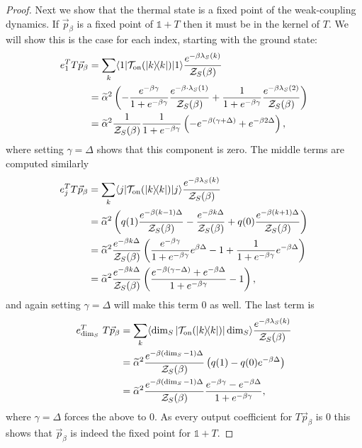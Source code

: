 \documentclass{article}
\newcommand{\on}{\rm on}
\newcommand{\ket}[1]{|#1\rangle}
\newcommand{\bra}[1]{\langle #1|}
\newcommand{\ketbra}[2]{| #1\rangle\! \langle #2|}
\newcommand{\partfun}{\mathcal{Z}}
\newcommand{\identity}{\mathds{1}}
\begin{document}
\begin{proof}
Next we show that the thermal state is a fixed point of the weak-coupling dynamics. If $\vec{p}_{\beta}$ is a fixed point of $\identity + T$ then it must be in the kernel of $T$. We will show this is the case for each index, starting with the ground state:
\begin{align}
    e_1^T T \vec{p}_{\beta} &= \sum_{k} \bra{1} \mathcal{T}_{\on}(\ketbra{k}{k}) \ket{1} \frac{e^{-\beta \lambda_S(k)}}{\partfun_S(\beta)} \\
    &= \widetilde{\alpha}^2 \left( -\frac{e^{-\beta \gamma}}{1 + e^{-\beta \gamma}} \frac{e^{-\beta \cdot \lambda_S(1)}}{\partfun_S(\beta)} + \frac{1}{1 + e^{-\beta \gamma}} \frac{e^{-\beta \lambda_S(2)}}{\partfun_S(\beta)} \right) \\
    &= \widetilde{\alpha}^2 \frac{1}{\partfun_S(\beta)} \frac{1}{1 + e^{-\beta \gamma}} \left( - e^{-\beta (\gamma + \Delta)} + e^{-\beta 2 \Delta} \right),
\end{align}
where setting $\gamma = \Delta$ shows that this component is zero.
The middle terms are computed similarly
\begin{align}
    e_j^T T \vec{p}_{\beta} &= \sum_{k} \bra{j} \mathcal{T}_{\on}(\ketbra{k}{k}) \ket{j} \frac{e^{-\beta \lambda_S(k)}}{\partfun_S(\beta)} \\
    &=\widetilde{\alpha}^2 \left( q(1) \frac{e^{-\beta (k - 1)\Delta }}{\partfun_S(\beta)} - \frac{e^{-\beta k \Delta}}{\partfun_S(\beta)} + q(0) \frac{e^{-\beta (k + 1) \Delta}}{\partfun_S(\beta)} \right) \\
    &= \widetilde{\alpha}^2 \frac{e^{-\beta k \Delta}}{\partfun_S(\beta)} \left( \frac{e^{-\beta \gamma}}{1 + e^{-\beta \gamma}} e^{\beta \Delta} - 1 + \frac{1}{1 + e^{-\beta \gamma}} e^{-\beta \Delta} \right) \\
    &= \widetilde{\alpha}^2 \frac{e^{-\beta k \Delta}}{\partfun_S(\beta)} \left( \frac{e^{-\beta (\gamma - \Delta)} + e^{-\beta \Delta}}{1 + e^{-\beta \gamma}} - 1 \right),  
\end{align}
and again setting $\gamma = \Delta$ will make this term 0 as well. The last term is
\begin{align}
    e_{\dim_S}^T ~T \vec{p}_{\beta} &= \sum_k \bra{\dim_S} \mathcal{T}_{\on}(\ketbra{k}{k})\ket{\dim_S} \frac{e^{-\beta \lambda_S(k)}}{\partfun_S(\beta)} \\
    &=\widetilde{\alpha}^2 \frac{e^{-\beta (\dim_S - 1) \Delta}}{\partfun_S(\beta)} \left( q(1) - q(0) e^{-\beta \Delta} \right) \\
    &= \widetilde{\alpha}^2 \frac{e^{-\beta (\dim_S - 1) \Delta}}{\partfun_S(\beta)} \frac{e^{-\beta \gamma} - e^{-\beta \Delta}}{1 + e^{-\beta \gamma}}, 
\end{align}
where $\gamma = \Delta$ forces the above to 0. As every output coefficient for $T \vec{p}_{\beta}$ is 0 this shows that $\vec{p}_{\beta}$ is indeed the fixed point for $\identity + T$. 


\end{proof}
\end{document}
